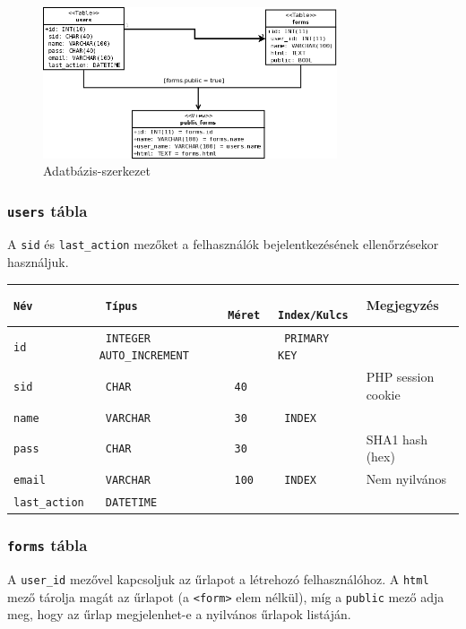 \documentclass[12pt,a4paper,twoside]{article}
\begin{document}
\clearpage
\begin{figure}[H]
  \centering
  \includegraphics[width=328px]{db.png}
  \caption{Adatbázis-szerkezet}\label{fig:db}
\end{figure}

\subsubsection{\texttt{users} tábla}
A \texttt{sid} és \texttt{last\_action} mezőket a felhasználók bejelentkezésének
ellenőrzésekor használjuk.

\small
\vspace{.3cm}
\begin{tabular*}{\textwidth}{>{\tt}l>{\tt}l>{\tt}l>{\tt}l|l}
  \rm Név       &  \rm Típus  &  \rm Méret  & \rm Index/Kulcs & Megjegyzés           \\
  \hline
  id           &   INTEGER AUTO\_INCREMENT && PRIMARY KEY    &                      \\
  sid          &   CHAR      & 40          &                 &  PHP session cookie  \\
  name         &   VARCHAR   & 30          & INDEX           &                      \\
  pass         &   CHAR      & 30          &                 &  SHA1 hash (hex)     \\
  email        &   VARCHAR   & 100         & INDEX           &  Nem nyilvános       \\
  last\_action &   DATETIME  &             &                 &
\end{tabular*}
\normalsize

\subsubsection{\texttt{forms} tábla}

A \texttt{user\_id} mezővel kapcsoljuk az űrlapot a létrehozó felhasználóhoz. A
\texttt{html} mező tárolja magát az űrlapot (a \texttt{<form>} elem nélkül), míg
a \texttt{public} mező adja meg, hogy az űrlap megjelenhet-e a nyilvános űrlapok
listáján.
\end{document}
